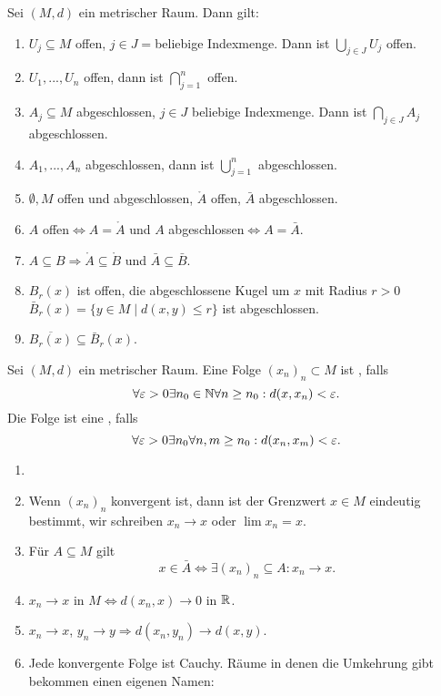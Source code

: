 \begin{bemerkung}
	Sei $ (M,d) $ ein metrischer Raum. Dann gilt:
	\begin{enumerate}
		\item $ U_j\subseteq M $ offen, $ j\in J= $beliebige Indexmenge. Dann ist $ \bigcup_{j\in J} U_j $ offen.
		\item $ U_1,...,U_n $ offen, dann ist $ \bigcap_{j=1}^n $ offen.
		\item $ A_j\subseteq M $ abgeschlossen, $ j\in J $ beliebige Indexmenge. Dann ist $ \bigcap_{j\in J}  A_j$ abgeschlossen.
		\item $ A_1,...,A_n $ abgeschlossen, dann ist $ \bigcup_{j=1}^n $ abgeschlossen.
		\item $ \emptyset, M $ offen und abgeschlossen, $ \mathring A $ offen, $ \bar A $ abgeschlossen.
		\item $ A $ offen$ \Leftrightarrow A=\mathring A $ und $ A $ abgeschlossen$ \Leftrightarrow A=\bar A $.
		\item $ A\subseteq B\Rightarrow \mathring A\subseteq \mathring B $ und $ \bar A\subseteq\bar B $.
		\item $ B_r(x) $ ist offen, die abgeschlossene Kugel um $ x $ mit Radius $ r>0 $ $ \bar B_r(x)=\lbrace y\in M\mid d(x,y)\leq r\rbrace $ ist abgeschlossen.
		\item $ \overline{B_r(x)}\subseteq\bar B_r(x) $.
		\end{enumerate}
\end{bemerkung}
\begin{definition}
	Sei $ (M,d) $ ein metrischer Raum. Eine Folge $ (x_n)_n\subset M $ ist , falls
	\[ \forall\varepsilon>0\exists n_0\in\mathbb{N}\forall n\geq n_0: d(x,x_n)<\varepsilon. \]
	Die Folge ist eine , falls
	\[ \forall\varepsilon>0\exists n_0\forall n,m\geq n_0:d(x_n,x_m)<\varepsilon. \]
\end{definition}
\begin{bemerkung}
	\begin{enumerate}
		\item[]
		\item Wenn $ (x_n)_n $ konvergent ist, dann ist der Grenzwert $ x\in M $ eindeutig bestimmt, wir schreiben $ x_n\rightarrow x $ oder $ \lim x_n=x $.
		\item F\"ur $ A\subseteq M $ gilt
		\[ x\in\bar A\Leftrightarrow\exists (x_n)_n\subseteq A:x_n\to x. \]
		\item $ x_n\to x $ in $ M\Leftrightarrow d(x_n,x)\to 0 $ in $ \mathbb{R} $.
		\item $ x_n\to x $, $ y_n\to y\Rightarrow d(x_n,y_n)\to d(x,y) $.
		\item Jede konvergente Folge ist Cauchy. R\"aume in denen die Umkehrung gibt bekommen einen eigenen Namen: 
	\end{enumerate}
\end{bemerkung}

